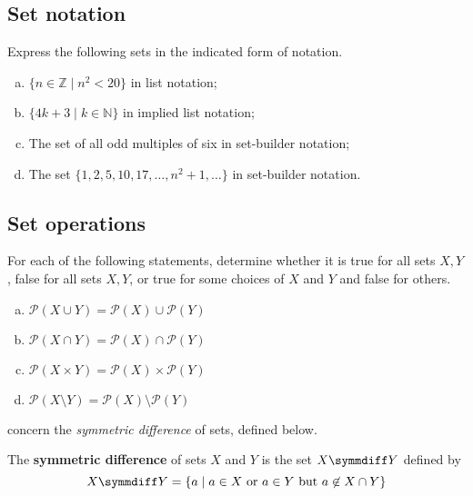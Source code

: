 \subsection*{Set notation}

\begin{chapex}
Express the following sets in the indicated form of notation.
\begin{enumerate}[(a)]
\item $\{ n \in \mathbb{Z} \mid n^2 < 20 \}$ in list notation;
\item $\{ 4k+3 \mid k \in \mathbb{N} \}$ in implied list notation;
\item The set of all odd multiples of six in set-builder notation;
\item The set $\{ 1, 2, 5, 10, 17, \dots, n^2+1, \dots \}$ in set-builder notation.
\end{enumerate}
\end{chapex}

\subsection*{Set operations}

\begin{chapex}
\label{cqPowerSetRespectSetOperations}
For each of the following statements, determine whether it is true for all sets $X,Y$, false for all sets $X,Y$, or true for some choices of $X$ and $Y$ and false for others.
\begin{multicols}{2}
\begin{enumerate}[(a)]
\item $\mathcal{P}(X \cup Y) = \mathcal{P}(X) \cup \mathcal{P}(Y)$
\item $\mathcal{P}(X \cap Y) = \mathcal{P}(X) \cap \mathcal{P}(Y)$
\item $\mathcal{P}(X \times Y) = \mathcal{P}(X) \times \mathcal{P}(Y)$
\item $\mathcal{P}(X \setminus Y) = \mathcal{P}(X) \setminus \mathcal{P}(Y)$
\end{enumerate}
\end{multicols}
\end{chapex}

 concern the \textit{symmetric difference} of sets, defined below.

\begin{definition}
\label{defSymmetricDifference}
The \textbf{symmetric difference} of sets $X$ and $Y$ is the set $X \symmdiff Y$  defined by
\[ X \symmdiff Y = \{ a \mid a \in X \text{ or } a \in Y \text{ but } a \not\in X \cap Y \} \]
\end{definition}

